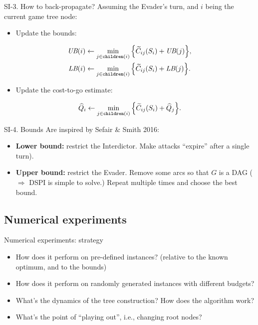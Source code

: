 \documentclass[10pt, xcolor=svgnames]{beamer}
\begin{document}
\begin{frame}[label={sec:org23ad0b8}]{SI-3. How to back-propagate?}
Assuming the Evader's turn, and \(i\) being the current game tree node:
\begin{itemize}
\item Update the bounds:
\end{itemize}
\begin{align*}
  \UB{i} &\gets \min_{j\in\children{i}} \Big\{ \widetilde{C}_{ij}(S_i) + \UB{j} \Big\},\\
  \LB{i} &\gets \min_{j\in\children{i}} \Big\{ \widetilde{C}_{ij}(S_i) + \LB{j} \Big\}.
\end{align*}

\begin{itemize}
\item Update the cost-to-go estimate:
\end{itemize}
\begin{equation*}
\widehat{Q}_i \gets \min_{j\in\texttt{children}(i)} \Big\{ \widetilde{C}_{ij}(S_i) + \widehat{Q}_j\Big\}.
\end{equation*}
\end{frame}
\begin{frame}[label={sec:orga172968}]{SI-4. Bounds}
Are inspired by Sefair \& Smith 2016:
\begin{itemize}
\item \textbf{Lower bound:} restrict the \alert{Interdictor}. Make attacks ``expire'' after a single turn).
\item \textbf{Upper bound:} restrict the \alert{Evader}. Remove some arcs so that \(G\) is a DAG (\(\Rightarrow\) DSPI is simple to solve.) Repeat multiple times and choose the best bound.
\end{itemize}
\end{frame}
\subsection{Numerical experiments}
\label{sec:orgef8dfcf}
\begin{frame}[label={sec:orga006d04}]{Numerical experiments: strategy}
\begin{itemize}
\item How does it perform on pre-defined instances? (relative to the known optimum, and to the bounds)
\item How does it perform on randomly generated instances with different budgets?
\item What's the dynamics of the tree construction? How does the algorithm work?
\item What's the point of ``playing out'', i.e., changing root nodes?
\end{itemize}
\end{frame}
\end{document}
